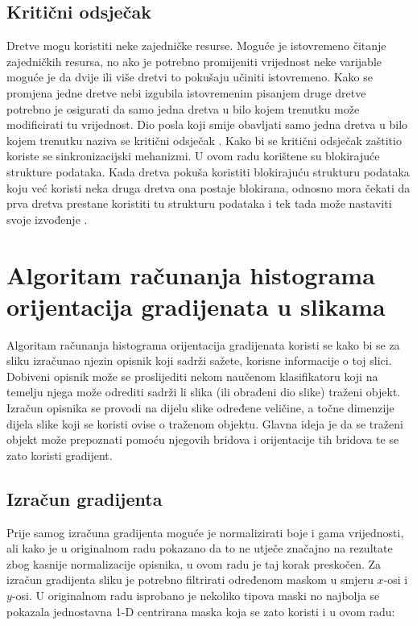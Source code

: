 \documentclass[times, utf8, zavrsni]{fer}
\begin{document}
\def\UrlBreaks{\do\/\do-}

\section{Kritični odsječak}
Dretve mogu koristiti neke zajedničke resurse. Moguće je istovremeno čitanje zajedničkih resursa, no ako je potrebno promijeniti vrijednost neke varijable moguće je da dvije ili više dretvi to pokušaju učiniti istovremeno. Kako se promjena jedne dretve nebi izgubila istovremenim pisanjem druge dretve potrebno je osigurati da samo jedna dretva u bilo kojem trenutku može modificirati tu vrijednost. Dio posla koji smije obavljati samo jedna dretva u bilo kojem trenutku naziva se kritični odsječak . Kako bi se kritični odsječak zaštitio koriste se sinkronizacijski mehanizmi. U ovom radu korištene su blokirajuće strukture podataka. Kada dretva pokuša koristiti blokirajuću strukturu podataka koju već koristi neka druga dretva ona postaje blokirana, odnosno mora čekati da prva dretva prestane koristiti tu strukturu podataka i tek tada može nastaviti svoje izvođenje \citep{os}.

\chapter{Algoritam računanja histograma orijentacija gradijenata u slikama}
Algoritam računanja histograma orijentacija gradijenata  koristi se kako bi se za sliku izračunao njezin opisnik koji sadrži sažete, korisne informacije o toj slici. Dobiveni opisnik može se proslijediti nekom naučenom klasifikatoru koji na temelju njega može odrediti sadrži li slika (ili obrađeni dio slike) traženi objekt. Izračun opisnika se provodi na dijelu slike određene veličine, a točne dimenzije dijela slike koji se koristi ovise o traženom objektu. Glavna ideja je da se traženi objekt može prepoznati pomoću njegovih bridova i orijentacije tih bridova te se zato koristi gradijent.

\section{Izračun gradijenta}
Prije samog izračuna gradijenta moguće je normalizirati boje i gama vrijednosti, ali kako je u originalnom radu \citep{dalal2005histograms} pokazano da to ne utječe značajno na rezultate zbog kasnije normalizacije opisnika, u ovom radu je taj korak preskočen. Za izračun gradijenta sliku je potrebno filtrirati određenom maskom u smjeru \(x\)-osi i \(y\)-osi. U originalnom radu \citep{dalal2005histograms} isprobano je nekoliko tipova maski no najbolja se pokazala jednostavna 1-D centrirana maska koja se zato koristi i u ovom radu: 
\end{document}
